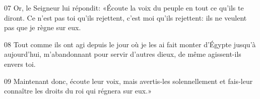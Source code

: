 
07 Or, le Seigneur lui répondit: «Écoute la voix du peuple en tout ce qu’ils te diront. Ce n’est pas toi qu’ils rejettent, c’est moi qu’ils rejettent: ils ne veulent pas que je règne sur eux.

08 Tout comme ils ont agi depuis le jour où je les ai fait monter d’Égypte jusqu’à aujourd’hui, m’abandonnant pour servir d’autres dieux, de même agissent-ils envers toi.

09 Maintenant donc, écoute leur voix, mais avertis-les solennellement et fais-leur connaître les droits du roi qui régnera sur eux.»

